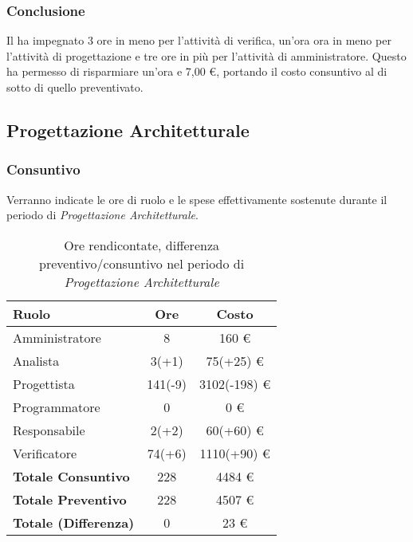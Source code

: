 \subsubsection{Conclusione}
Il  ha impegnato 3 ore in meno per l'attivit\`a di verifica, un'ora ora in meno per l'attivit\`a di progettazione e tre ore in più per l'attivit\`a di amministratore. Questo ha permesso di risparmiare un'ora e 7,00 \euro{}, portando il costo consuntivo al di sotto di quello preventivato.

\newpage


\subsection{Progettazione Architetturale}
\subsubsection{Consuntivo}
Verranno indicate le ore di ruolo e le spese effettivamente sostenute durante il periodo di \textit{Progettazione Architetturale}.

\begin{table}[H]
	\centering
	\begin{tabular}{ l c c }
		\textbf{Ruolo} & \textbf{Ore} & \textbf{Costo} \\
		\hline
		Amministratore & 8 & 160 \euro{} \\
		Analista & 3(+1) & 75(+25) \euro{} \\
		Progettista & 141(-9) & 3102(-198) \euro{} \\
		Programmatore & 0 & 0 \euro{} \\
		Responsabile & 2(+2) & 60(+60) \euro{} \\
		Verificatore & 74(+6) & 1110(+90) \euro{} \\
		\hline
		\textbf{Totale Consuntivo} & 228 & 4484 \euro{} \\
		\hline
		\textbf{Totale Preventivo} & 228 & 4507 \euro{} \\
		\hline
		\textbf{Totale (Differenza)} & 0 & 23 \euro{} \\
		\hline
	\end{tabular}
	\caption{Ore rendicontate, differenza preventivo/consuntivo nel periodo di \textit{Progettazione Architetturale}}
\end{table}



